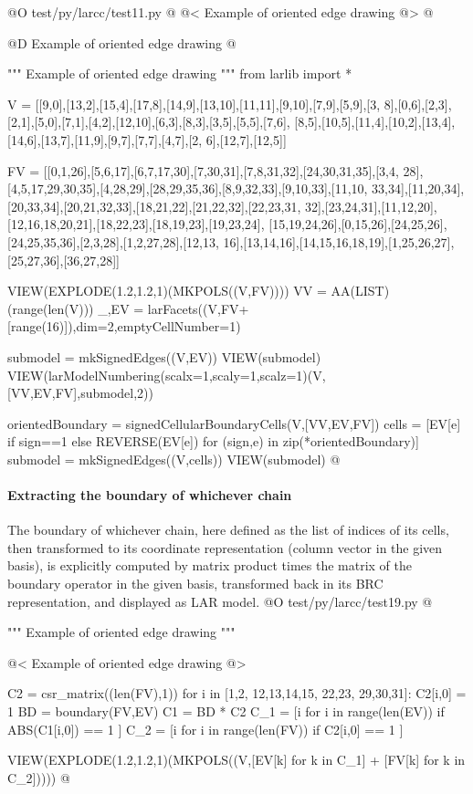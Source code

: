 \documentclass[11pt,oneside]{article}    %
\begin{document}
@O test/py/larcc/test11.py
@{
@< Example of oriented edge drawing @>
@}

@D Example of oriented edge drawing
@{""" Example of oriented edge drawing """
from larlib import *

V = [[9,0],[13,2],[15,4],[17,8],[14,9],[13,10],[11,11],[9,10],[7,9],[5,9],[3,
8],[0,6],[2,3],[2,1],[5,0],[7,1],[4,2],[12,10],[6,3],[8,3],[3,5],[5,5],[7,6],
[8,5],[10,5],[11,4],[10,2],[13,4],[14,6],[13,7],[11,9],[9,7],[7,7],[4,7],[2,
6],[12,7],[12,5]]

FV = [[0,1,26],[5,6,17],[6,7,17,30],[7,30,31],[7,8,31,32],[24,30,31,35],[3,4,
28],[4,5,17,29,30,35],[4,28,29],[28,29,35,36],[8,9,32,33],[9,10,33],[11,10,
33,34],[11,20,34],[20,33,34],[20,21,32,33],[18,21,22],[21,22,32],[22,23,31,
32],[23,24,31],[11,12,20],[12,16,18,20,21],[18,22,23],[18,19,23],[19,23,24],
[15,19,24,26],[0,15,26],[24,25,26],[24,25,35,36],[2,3,28],[1,2,27,28],[12,13,
16],[13,14,16],[14,15,16,18,19],[1,25,26,27],[25,27,36],[36,27,28]]

VIEW(EXPLODE(1.2,1.2,1)(MKPOLS((V,FV))))
VV = AA(LIST)(range(len(V)))
_,EV = larFacets((V,FV+[range(16)]),dim=2,emptyCellNumber=1)

submodel = mkSignedEdges((V,EV))
VIEW(submodel)
VIEW(larModelNumbering(scalx=1,scaly=1,scalz=1)(V,[VV,EV,FV],submodel,2))

orientedBoundary = signedCellularBoundaryCells(V,[VV,EV,FV])
cells = [EV[e] if sign==1 else REVERSE(EV[e]) for (sign,e) in zip(*orientedBoundary)]
submodel = mkSignedEdges((V,cells))
VIEW(submodel)
@}


\paragraph{Extracting the boundary of whichever chain}

The boundary of whichever chain, here defined as the list of indices of its cells, then transformed to its coordinate representation (column vector in the given basis), is explicitly computed by matrix product times the matrix of the boundary operator in the given basis, transformed back in its BRC representation, and displayed as  LAR model.
@O test/py/larcc/test19.py
@{""" Example of oriented edge drawing """

@< Example of oriented edge drawing @>

C2 = csr_matrix((len(FV),1))
for i in [1,2, 12,13,14,15, 22,23, 29,30,31]: C2[i,0] = 1
BD = boundary(FV,EV)
C1 = BD * C2
C_1 = [i for i in range(len(EV)) if ABS(C1[i,0]) == 1 ]
C_2 = [i for i in range(len(FV)) if C2[i,0] == 1 ]

VIEW(EXPLODE(1.2,1.2,1)(MKPOLS((V,[EV[k] for k in C_1] + [FV[k] for k in C_2]))))
@}
\end{document}
